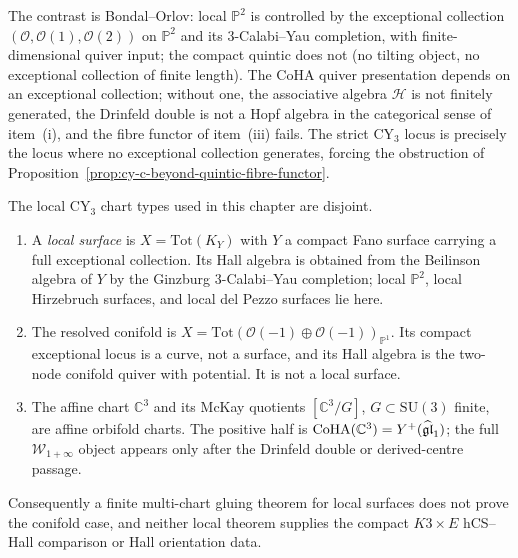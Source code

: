 \begin{remark}
\label{rem:cy-c-beyond-local-vs-compact}
The contrast is Bondal--Orlov: local $\mathbb{P}^2$ is controlled by the exceptional
collection $(\mathcal O,\mathcal O(1),\mathcal O(2))$ on $\mathbb P^2$ and its
$3$-Calabi--Yau completion, with finite-dimensional quiver input; the compact quintic does not (no tilting
object, no exceptional collection of finite length). The CoHA quiver presentation
depends on an exceptional collection; without one, the associative algebra $\mathcal{H}$
is not finitely generated, the Drinfeld double is not a Hopf algebra in the categorical
sense of item~(i), and the fibre functor of item~(iii) fails. The strict CY$_3$ locus is
precisely the locus where no exceptional collection generates, forcing the
obstruction of Proposition~\ref{prop:cy-c-beyond-quintic-fibre-functor}.
\end{remark}

\begin{proposition}
\label{prop:cy-c-beyond-local-surface-conifold-c3-disjunction}
The local CY$_3$ chart types used in this chapter are disjoint.
\begin{enumerate}[label=\textup{(\roman*)}]
 \item A \emph{local surface} is $X=\mathrm{Tot}(K_Y)$ with $Y$ a
 compact Fano surface carrying a full exceptional collection. Its Hall
 algebra is obtained from the Beilinson algebra of $Y$ by the
 Ginzburg $3$-Calabi--Yau completion; local $\mathbb P^2$, local
 Hirzebruch surfaces, and local del Pezzo surfaces lie here.
 \item The resolved conifold is
 $X=\mathrm{Tot}(\mathcal O(-1)\oplus\mathcal O(-1))_{\mathbb P^1}$.
 Its compact exceptional locus is a curve, not a surface, and its
 Hall algebra is the two-node conifold quiver with potential. It is
 not a local surface.
 \item The affine chart $\mathbb C^3$ and its McKay quotients
 $[\mathbb C^3/G]$, $G\subset\mathrm{SU}(3)$ finite, are affine
 orbifold charts. The positive half is
 $\mathrm{CoHA}(\mathbb C^3)=Y^+(\widehat{\mathfrak{gl}}_1)$; the full
 $\mathcal W_{1+\infty}$ object appears only after the Drinfeld
 double or derived-centre passage.
\end{enumerate}
Consequently a finite multi-chart gluing theorem for local surfaces
does not prove the conifold case, and neither local theorem supplies
the compact $K3\times E$ hCS--Hall comparison or Hall orientation
data.
\end{proposition}

